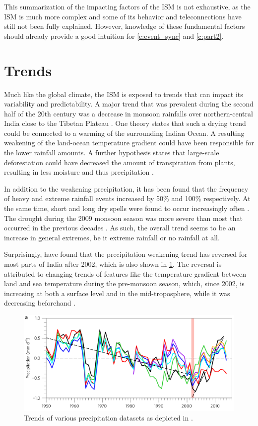 This summarization of the impacting factors of the ISM is not exhaustive, as the ISM is much more complex and some of its behavior and teleconnections have still not been fully explained. However, knowledge of these fundamental factors should already provide a good intuition for \cref{c:event_sync} and \cref{c:part2}.


\section{Trends}
\label{st:ism_trends}
Much like the global climate, the ISM is exposed to trends that can impact its variability and predictability. A major trend that was prevalent during the second half of the 20th century was a decrease in monsoon rainfalls over northern-central India close to the Tibetan Plateau \citep{Jin.2017}. One theory states that such a drying trend could be connected to a warming of the surrounding Indian Ocean. A resulting weakening of the land-ocean temperature gradient could have been responsible for the lower rainfall amounts. A further hypothesis states that large-scale deforestation could have decreased the amount of transpiration from plants, resulting in less moisture and thus precipitation \citep{Jin.2017}.

In addition to the weakening precipitation, it has been found that the frequency of heavy and extreme rainfall events increased by 50\% and 100\% respectively. At the same time, short and long dry spells were found to occur increasingly often \citep{Auffhammer.2012}. The drought during the 2009 monsoon season was more severe than most that occurred in the previous decades \citep{Auffhammer.2012}. As such, the overall trend seems to be an increase in general extremes, be it extreme rainfall or no rainfall at all.

Surprisingly, \citet{Jin.2017} have found that the precipitation weakening trend has reversed for most parts of India after 2002, which is also shown in \cref{fig:precipitation_trend}. The reversal is attributed to changing trends of features like the temperature gradient between land and sea temperature during the pre-monsoon season, which, since 2002, is increasing at both a surface level and in the mid-troposphere, while it was decreasing beforehand \citep{Jin.2017}.

\begin{figure}[h]
  \centering
  \includegraphics[width=0.7\linewidth]{./99_appendix/img/precipitation_trend}
  \caption{Trends of various precipitation datasets as depicted in \citet{Jin.2017}.}
  \label{fig:precipitation_trend}
\end{figure}


